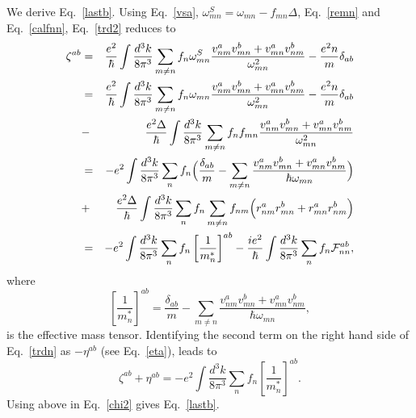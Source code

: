 \documentclass[floatfix,prb,aps,superscriptaddress,11pt]{revtex4}
\begin{document}
We derive Eq.~\eqref{lastb}.
Using
Eq.~\eqref{vsa},
$\omega_{mn}^{S}=\omega_{mn}-f_{mn}\Delta$, Eq.~\eqref{remn} and
Eq.~\eqref{calfnn},
 Eq.~\eqref{trd2} reduces to 
\begin{eqnarray}
\zeta ^{ab} &=&
\frac{e^{2}}{\hbar }\int \frac{d^{3}k}{8\pi ^{3}}
\sum_{m\ne n}f_n\omega_{mn}^S\frac{v_{nm}^av_{mn}^b
+v_{mn}^av_{nm}^b}{\omega_{mn}^2}-\frac{e^{2}n}{m}\delta_{ab}
\nonumber\\
&=&
\frac{e^{2}}{\hbar }\int \frac{d^{3}k}{8\pi ^{3}}
\sum_{m\ne n}f_n\omega_{mn}\frac{v_{nm}^av_{mn}^b
+v_{mn}^av_{nm}^b}{\omega_{mn}^2}
-\frac{e^{2}n}{m}\delta_{ab}
\nonumber\\
&-&
\frac{e^{2}\Delta}{\hbar }\int \frac{d^{3}k}{8\pi ^{3}}
\sum_{m\ne n}f_nf_{mn}\frac{v_{nm}^av_{mn}^b
+v_{mn}^av_{nm}^b}{\omega_{mn}^2}
\nonumber \\
&=&
-e^{2}\int \frac{d^{3}k}{8\pi ^{3}}
\sum_{n} 
f_n\Big(
\frac{\delta_{ab}}{m}
-
\sum_{m\ne n}
\frac{v_{nm}^av_{mn}^b
+v_{mn}^av_{nm}^b}{\hbar\omega_{mn}}
\Big)
\nonumber\\
&+&
\frac{e^{2}\Delta}{\hbar }\int \frac{d^{3}k}{8\pi ^{3}}
\sum_nf_n\sum_{m\ne n}f_{nm}\Big(r_{nm}^ar_{mn}^b
+r_{mn}^ar_{nm}^b\Big)
\nonumber\\
&=&-e^{2}\int \frac{d^{3}k}{8\pi ^{3}}\sum_{n}f_{n}\left[ \frac{1}{
m_{n}^{\ast}}\right]^{ab}
-
\frac{ie^{2}}{\hbar }\int \frac{d^{3}k}{8\pi
^{3}}\sum_{n}f_n{\cal F}^{ab}_{nn}
,
\label{trdn}
\end{eqnarray}
where 
\begin{equation}\label{meff}
\left[ \frac{1}{m_{n}^{\ast }}\right]
^{ab}=\frac{\delta_{ab}}{m}-\sum_{m\ne n}
\frac{v_{nm}^{a}v_{mn}^{b}+v_{mn}^{a}v_{nm}^{b}}{\hbar \omega_{mn}}
,
\end{equation}
is the effective mass tensor. Identifying the second term on the right hand
side of Eq.~\eqref{trdn} as $-\eta ^{ab}$ (see Eq.~\eqref{eta}), 
leads to 
\begin{equation*}
\zeta ^{ab}+\eta ^{ab}=-e^{2}\int \frac{d^{3}k}{8\pi ^{3}}\sum_{n}f_{n}\left[
\frac{1}{m_{n}^{\ast }}\right] ^{ab}.  \label{etam}
\end{equation*}
Using above in Eq.~\eqref{chi2} gives Eq.~\eqref{lastb}.


\end{document}
